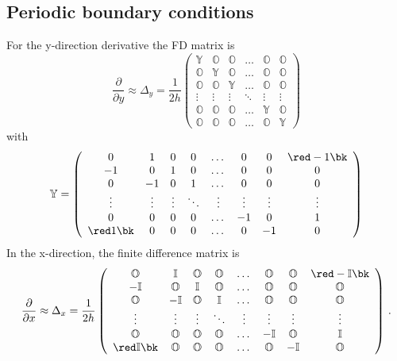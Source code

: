 \subsection{Periodic boundary conditions}
For the y-direction derivative the FD matrix is
\begin{equation} \label{eq_FDmatrix_der1_y}
	\frac{\partial }{\partial y} \approx \Delta_y= \frac{1}{2h}\left(\begin{array}{cccccc}
		\mathbb{Y} & \mathbb{O} & \mathbb{O}& \dots&\mathbb{O} &\mathbb{O}\\
		\mathbb{O}&\mathbb{Y} &  \mathbb{O}& \dots&\mathbb{O}&\mathbb{O}\\
		\mathbb{O}&\mathbb{O}&\mathbb{Y} & \dots &  \mathbb{O}&\mathbb{O}\\
		\vdots&\vdots&\vdots&\ddots &\vdots&\vdots\\
		\mathbb{O}&\mathbb{O}&\mathbb{O}&\dots &\mathbb{Y} & \mathbb{O} \\
		\mathbb{O}&\mathbb{O}&\mathbb{O}&\dots &\mathbb{O}&\mathbb{Y}
	\end{array}\right)
\end{equation}
with
\begin{equation}
	\mathbb{Y} = \left(\begin{array}{cccccccc}
		0 & 1 & 0&  0 & \dots & 0 & 0 & \red -1 \bk\\
		-1 & 0 &  1& 0 & \dots& 0 & 0 & 0\\
		0 &-1&0 & 1 & \dots & 0 & 0 & 0\\
		\vdots&\vdots&\vdots&\ddots &\vdots&\vdots&\vdots&\vdots\\
		0 & 0 & 0 &0 &  \dots & -1 & 0 & 1 \\
		\red 1 \bk & 0 & 0 &0 &  \dots & 0 &-1 &0
	\end{array}\right)
\end{equation}
In the x-direction, the finite difference matrix is
\begin{equation}
	\frac{\partial }{\partial x} \approx \Delta_x = \frac{1}{2h}
	\left(\begin{array}{cccccccc}
		\mathbb{O} & \mathbb{I} & \mathbb{O}& \mathbb{O}&\dots &\mathbb{O} &  \mathbb{O} & \red -\mathbb{I} \bk \\
		-\mathbb{I}&\mathbb{O} &  \mathbb{I}& \mathbb{O}&\dots&\mathbb{O}&  \mathbb{O}&\mathbb{O}\\
		\mathbb{O}& -\mathbb{I}&\mathbb{O} & \mathbb{I}& \dots & \mathbb{O}&  \mathbb{O}&  \mathbb{O}\\
		\vdots&\vdots&\vdots&\ddots &\vdots&\vdots&\vdots&\vdots\\
		\mathbb{O}&\mathbb{O}&\mathbb{O}&\mathbb{O}&\dots & -\mathbb{I}&  \mathbb{O} & \mathbb{I} \\
		\red\mathbb{I} \bk&\mathbb{O}&\mathbb{O}&\mathbb{O}&\dots &\mathbb{O}& -\mathbb{I} &\mathbb{O}
	\end{array}\right) \,.
\end{equation}


